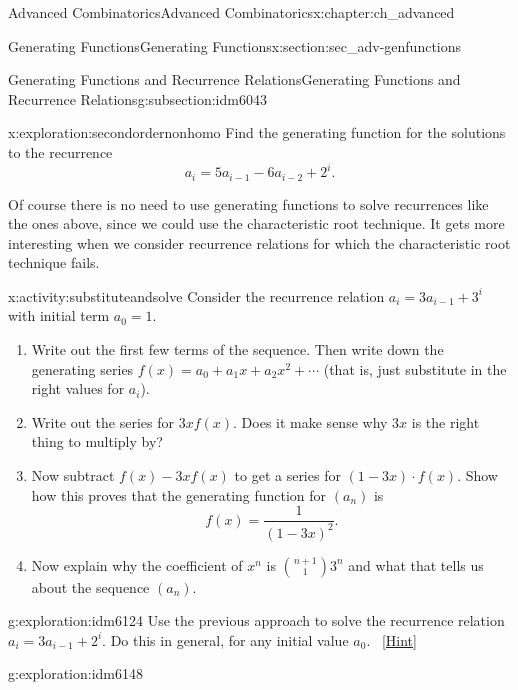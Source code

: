\documentclass[oneside,10pt,]{book}
\numberwithin{equation}{chapter}
\begin{document}
\begin{chapterptx}{Advanced Combinatorics}{}{Advanced Combinatorics}{}{}{x:chapter:ch_advanced}
\begin{sectionptx}{Generating Functions}{}{Generating Functions}{}{}{x:section:sec_adv-genfunctions}
\begin{subsectionptx}{Generating Functions and Recurrence Relations}{}{Generating Functions and Recurrence Relations}{}{}{g:subsection:idm6043}
\begin{exploration}{}{x:exploration:secondordernonhomo}%
Find the generating function for the solutions to the recurrence%
\begin{equation*}
a_i=5a_{i-1}-6a_{i-2} + 2^i.
\end{equation*}
%
\end{exploration}
Of course there is no need to use generating functions to solve recurrences like the ones above, since we could use the characteristic root technique.  It gets more interesting when we consider recurrence relations for which the characteristic root technique fails.%
\begin{activity}{}{x:activity:substituteandsolve}%
Consider the recurrence relation \(a_i=3a_{i-1} + 3^i\) with initial term \(a_0 = 1\).%
\begin{enumerate}[font=\bfseries,label=(\alph*),ref=\alph*]
\item{}Write out the first few terms of the sequence.  Then write down the generating series \(f(x) = a_0 + a_1x + a_2x^2 + \cdots\) (that is, just substitute in the right values for \(a_i\)). %
\item{}Write out the series for \(3x f(x)\).  Does it make sense why \(3x\) is the right thing to multiply by?%
\item{}Now subtract \(f(x) - 3xf(x)\) to get a series for \((1-3x)\cdot f(x)\).  Show how this proves that the generating function for \((a_n)\) is%
\begin{equation*}
f(x) = \frac{1}{(1-3x)^2}\text{.}
\end{equation*}
%
\item{}Now explain why the coefficient of \(x^n\) is \(\binom{n+1}{1}3^n\) and what that tells us about the sequence \((a_n)\).%
\end{enumerate}
\end{activity}
\begin{exploration}{}{g:exploration:idm6124}%
Use the previous approach to solve the recurrence relation \(a_i=3a_{i-1} + 2^i\).  Do this in general, for any initial value \(a_0\).%
\qquad~\hfill{\tiny\hyperlink{g:hint:idm6129-back}{[Hint]}}\end{exploration}
\begin{exploration}{}{g:exploration:idm6148}%

\end{exploration}
\end{subsectionptx}
\end{sectionptx}
\end{chapterptx}
\end{document}
